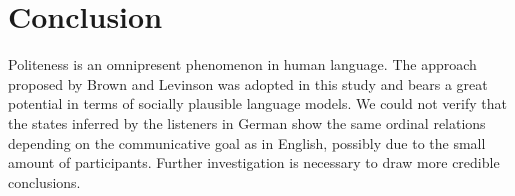 \documentclass[a4paper,11pt]{article}
\begin{document}
\section{Conclusion}
Politeness is an omnipresent phenomenon in human language. The approach proposed by Brown and Levinson \cite{brown1987politeness} was adopted in this study and bears a great potential in terms of socially plausible language models. We could not verify that the states inferred by the listeners in German show the same ordinal relations depending on the communicative goal as in English, possibly due to the small amount of participants. Further investigation is necessary to draw more credible conclusions. 


\end{document}
